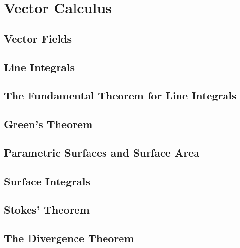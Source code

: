 \section{Vector Calculus}

\subsection{Vector Fields}

\subsection{Line Integrals}

\subsection{The Fundamental Theorem for Line Integrals}

\subsection{Green's Theorem}

\subsection{Parametric Surfaces and Surface Area}

\subsection{Surface Integrals}

\subsection{Stokes' Theorem}

\subsection{The Divergence Theorem}